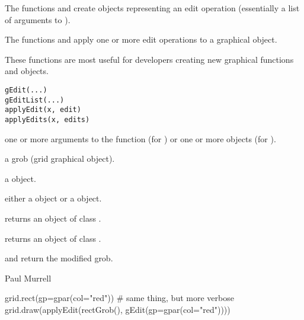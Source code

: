 %
\begin{Description}\relax
The functions  and  create
objects representing an edit operation (essentially a list
of arguments to ).

The functions  and  apply
one or more edit operations to a graphical object.

These functions are most useful for developers creating new
graphical functions and objects.
\end{Description}
%
\begin{Usage}
\begin{verbatim}
gEdit(...)
gEditList(...)
applyEdit(x, edit)
applyEdits(x, edits)
\end{verbatim}
\end{Usage}
%
\begin{Arguments}
\begin{ldescription}
\item[\code{...}]  one or more arguments to the  function
(for ) or one or more  objects
(for ).
\item[\code{x}]  a grob (grid graphical object).
\item[\code{edit}]  a  object.
\item[\code{edits}]  either a  object or a 
object.
\end{ldescription}
\end{Arguments}
%
\begin{Value}
 returns an object of class .

 returns an object of class .

 and  return the modified grob.
\end{Value}
%
\begin{Author}\relax
 Paul Murrell 
\end{Author}
%
\begin{SeeAlso}\relax
{}
\end{SeeAlso}
%
\begin{Examples}
\begin{ExampleCode}
grid.rect(gp=gpar(col="red"))
# same thing, but more verbose
grid.draw(applyEdit(rectGrob(), gEdit(gp=gpar(col="red"))))
\end{ExampleCode}
\end{Examples}
